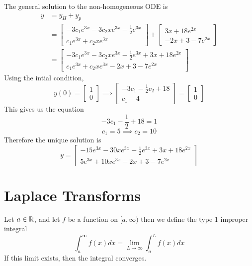 \documentclass[openany]{report}
\begin{document}
The general solution to the non-homogeneous ODE is 
\begin{align*}
    y &= y_H + y_p\\
    &= \begin{bmatrix}
        -3c_1e^{3x} - 3c_2xe^{3x} - \frac{1}{2}e^{3x}\\
        c_1e^{3x} + c_2xe^{3x}
    \end{bmatrix}
    + \begin{bmatrix}
        3x + 18e^{2x}\\
        -2x+3 - 7e^{2x}
    \end{bmatrix}\\
    &= \begin{bmatrix}
        -3c_1e^{3x} - 3c_2xe^{3x} - \frac{1}{2}e^{3x} + 3x + 18e^{2x}\\
        c_1e^{3x} + c_2xe^{3x} -2x+3 - 7e^{2x}
    \end{bmatrix}
\end{align*}
Using the intial condition, 
\[y(0) = \begin{bmatrix}
    1\\0
\end{bmatrix}\implies \begin{bmatrix}
    -3c_1 - \frac{1}{2}c_2 + 18\\
    c_1 -4
\end{bmatrix} = \begin{bmatrix}
    1\\0
\end{bmatrix}\]
This gives us the equation 
\[-3c_1 - \frac{1}{2} + 18 = 1\]
\[c_1 = 5 \implies c_2 = 10\]
Therefore the unique solution is 
\[y = \begin{bmatrix}
    -15e^{3x} - 30xe^{3x} - \frac{1}{2}e^{3x} + 3x + 18e^{2x}\\
    5e^{3x} + 10xe^{3x} -2x+3 - 7e^{2x}
\end{bmatrix}\]

\chapter{Laplace Transforms}

\begin{definition}
    Let $a \in \mathbb{R}$, and let $f$ be a function on $[a, \infty)$ then we define the type 1 improper integral 
    \[\int_a^\infty f(x)dx = \lim_{L\rightarrow\infty} \int_a^L f(x)dx\]
    If this limit exists, then the integral converges. 
\end{definition}
\end{document}
